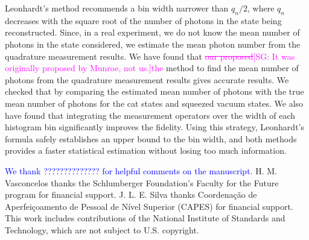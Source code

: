 \documentclass[
reprint,
superscriptaddress,
showpacs,
amsmath,
amssymb,
aps,
pra,
longbibliography
]{revtex4-1}
\providecommand{\aucmnt}[1]{#1}
\providecommand{\editcolor}[2]{\textcolor{#1}{#2}}
\providecommand{\aucmnt}[1]{}
\providecommand{\editcolor}[2]{#2}
\newcommand{\HV}[1]{\editcolor{blue}{#1}}
\newcommand{\SG}[1]{\editcolor{magenta}{#1}}
\newcommand{\SGs}[1]{\aucmnt{\editcolor{magenta}{\sout{#1}}}}
\newcommand{\SGc}[1]{\aucmnt{\editcolor{magenta}{[SG: #1]}}}
\begin{document}
Leonhardt's method recommends a bin width narrower than $q_n/2$, where
$q_n$ decreases with the square root of the number of photons in the
state being reconstructed.  Since, in a real experiment, we do not
know the mean number of photons in the state considered, we estimate
the mean photon number from the quadrature measurement results. We
have found that \SGs{our proposed}\SGc{It was originally proposed by
  Munroe, not us.}\SG{the} method to find the mean number of photons
from the quadrature measurement results gives accurate results. We
checked that by comparing the estimated mean number of photons with
the true mean number of photons for the cat states and squeezed vacuum
states. We also have found that integrating the measurement operators
over the width of each histogram bin significantly improves the
fidelity. Using this strategy, Leonhardt's formula safely establishes
an upper bound to the bin width, and both methods provides a faster
statistical estimation without losing too much information.



\begin{acknowledgments}
  \HV{We thank ?????????????? for
    helpful comments on the manuscript.}  H. M. Vasconcelos thanks the
  Schlumberger Foundation's Faculty for the Future program for
  financial support. J. L. E. Silva thanks Coordena\c c\~ao de
  Aperfei\c coamento de Pessoal de N\'ivel Superior (CAPES) for
  financial support. This work includes contributions of the National
  Institute of Standards and Technology, which are not subject to
  U.S. copyright.
\end{acknowledgments}




%


\end{document}
